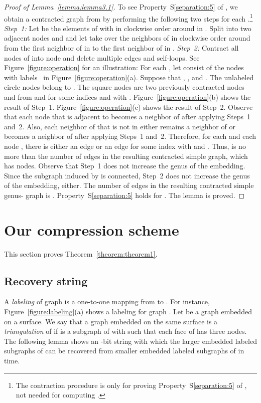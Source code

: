 \documentclass[12pt]{article}
\begin{document}
\begin{proof}[Proof of Lemma~\ref{lemma:lemma3.1}]
To see Property~S\ref{separation:5} of , we obtain a
contracted graph from  by performing the following two steps for
each .\footnote{The contraction procedure is only for
  proving Property~S\ref{separation:5} of , not needed for
  computing .}
{\em Step~1:} Let  be the elements of 
with  in clockwise
order around  in .  Split  into two adjacent nodes
 and  and let  take over the neighbors of  in
clockwise order around  from the first neighbor of  in
 to the first neighbor of  in . {\em Step~2:}
Contract all nodes of  into node  and delete multiple edges
and self-loops.  See Figure~\ref{figure:operation} for an
illustration: For each , let  consist of the nodes
with labels~ in Figure~\ref{figure:operation}(a).  Suppose that
, , and . The unlabeled circle
nodes belong to . The square nodes are two previously contracted
nodes  and  from  and  for some
indices  and  with .
Figure~\ref{figure:operation}(b) shows the result of
Step~1. Figure~\ref{figure:operation}(c) shows the result of Step~2.
Observe that each node that is adjacent to  becomes a neighbor of
 after applying Steps~1 and~2.  Also, each neighbor of 
that is not in  either remains a neighbor of  or becomes a
neighbor of  after applying Steps~1 and~2.  Therefore, for each
 and each node , there is either an
edge  or an edge  for some index  with
 and .  Thus,  is no more
than the number of edges in the resulting contracted simple graph,
which has  nodes.  Observe that Step~1
does not increase the genus of the embedding. Since the subgraph
induced by  is connected, Step~2 does not increase
the genus of the embedding, either.  The number of edges in the
resulting contracted simple genus- graph is
.  Property~S\ref{separation:5} holds for
.  The lemma is proved.
\end{proof}

\section{Our compression scheme}
\label{section:compression}
This section proves Theorem~\ref{theorem:theorem1}.


\subsection{Recovery string}

A {\em labeling} of graph  is a one-to-one mapping from  to
. For instance,
Figure~\ref{figure:labeling}(a) shows a labeling for graph .  Let
 be a graph embedded on a surface.  We say that a graph 
embedded on the same surface is a {\em triangulation} of  if  is
a subgraph of  with  such that each face of
 has three nodes.
The following lemma shows an -bit string with which the larger
embedded labeled subgraphs of  can be recovered from smaller
embedded labeled subgraphs of  in  time.
\end{document}
